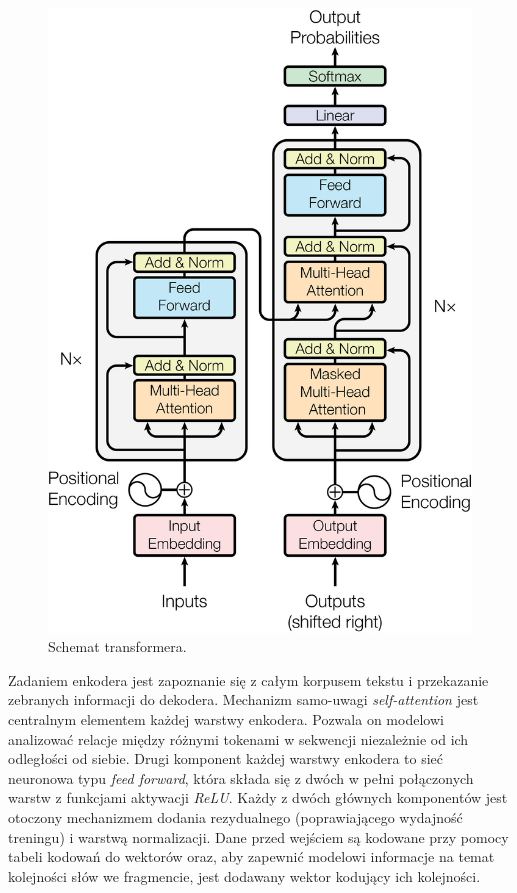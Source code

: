 \documentclass[data-science]{agh-wi} %
\begin{document}
\begin{figure}[!ht]
    \begin{center}
        \includegraphics[width=0.7\linewidth]{img/transformer1}
    \end{center}
    \caption{Schemat transformera.}
    \label{fig:transformer1}
\end{figure}

Zadaniem enkodera jest zapoznanie się z całym korpusem tekstu i przekazanie zebranych informacji do dekodera. Mechanizm samo-uwagi \textit{self-attention} jest centralnym elementem każdej warstwy enkodera. Pozwala on modelowi analizować relacje między różnymi tokenami w sekwencji niezależnie od ich odległości od siebie. Drugi komponent każdej warstwy enkodera to sieć neuronowa typu \textit{feed forward}, która składa się z dwóch w pełni połączonych warstw z funkcjami aktywacji \textit{ReLU}. Każdy z dwóch głównych komponentów jest otoczony mechanizmem dodania rezydualnego (poprawiającego wydajność treningu) i warstwą normalizacji. Dane przed wejściem są kodowane przy pomocy tabeli kodowań do wektorów oraz, aby zapewnić modelowi informacje na temat kolejności słów we fragmencie, jest dodawany wektor kodujący ich kolejności.
\end{document}
